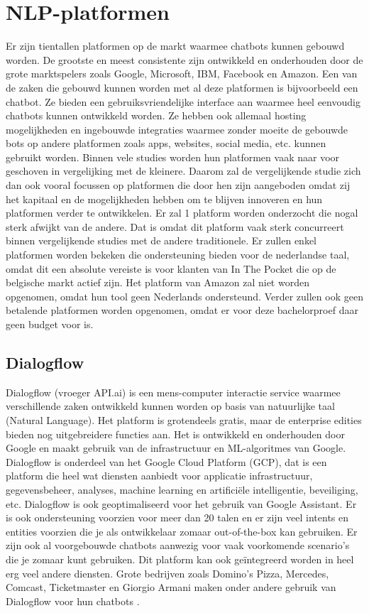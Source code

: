 \section{NLP-platformen}
\label{sec:nlp-platformen}

Er zijn tientallen platformen op de markt waarmee chatbots kunnen gebouwd worden. De grootste en meest consistente zijn ontwikkeld en onderhouden door de grote marktspelers zoals Google, Microsoft, IBM, Facebook en Amazon. Een van de zaken die gebouwd kunnen worden met al deze platformen is bijvoorbeeld een chatbot. Ze bieden een gebruiksvriendelijke interface aan waarmee heel eenvoudig chatbots kunnen ontwikkeld worden. Ze hebben ook allemaal hosting mogelijkheden en ingebouwde integraties waarmee zonder moeite de gebouwde bots op andere platformen zoals apps, websites, social media, etc. kunnen gebruikt worden. Binnen vele studies worden hun platformen vaak naar voor geschoven in vergelijking met de kleinere. Daarom zal de vergelijkende studie zich dan ook vooral focussen op platformen die door hen zijn aangeboden omdat zij het kapitaal en de mogelijkheden hebben om te blijven innoveren en hun platformen verder te ontwikkelen. Er zal 1 platform worden onderzocht die nogal sterk afwijkt van de andere. Dat is omdat dit platform vaak sterk concurreert binnen vergelijkende studies met de andere traditionele. Er zullen enkel platformen worden bekeken die ondersteuning bieden voor de nederlandse taal, omdat dit een absolute vereiste is voor klanten van In The Pocket die op de belgische markt actief zijn. Het platform van Amazon zal niet worden opgenomen, omdat hun tool geen Nederlands ondersteund. Verder zullen ook geen betalende platformen worden opgenomen, omdat er voor deze bachelorproef daar geen budget voor is.

\subsection{Dialogflow}
\label{subsec:nlp-platformen-dialogflow}

Dialogflow (vroeger API.ai) is een mens-computer interactie service waarmee verschillende zaken ontwikkeld kunnen worden op basis van natuurlijke taal (Natural Language). Het platform is grotendeels gratis, maar de enterprise edities bieden nog uitgebreidere functies aan. Het is ontwikkeld en onderhouden door Google en maakt gebruik van de infrastructuur en ML-algoritmes van Google. Dialogflow is onderdeel van het Google Cloud Platform (GCP), dat is een platform die heel wat diensten aanbiedt voor applicatie infrastructuur, gegevensbeheer, analyses, machine learning en artificiële intelligentie, beveiliging, etc. Dialogflow is ook geoptimaliseerd voor het gebruik van Google Assistant. Er is ook ondersteuning voorzien voor meer dan 20 talen en er zijn veel intents en entities voorzien die je als ontwikkelaar zomaar out-of-the-box kan gebruiken. Er zijn ook al voorgebouwde chatbots aanwezig voor vaak voorkomende scenario’s die je zomaar kunt gebruiken. Dit platform kan ook geïntegreerd worden in heel erg veel andere diensten. Grote bedrijven zoals Domino’s Pizza, Mercedes, Comcast, Ticketmaster en Giorgio Armani maken onder andere gebruik van Dialogflow voor hun chatbots \autocite{Dialogflow2020}. 

